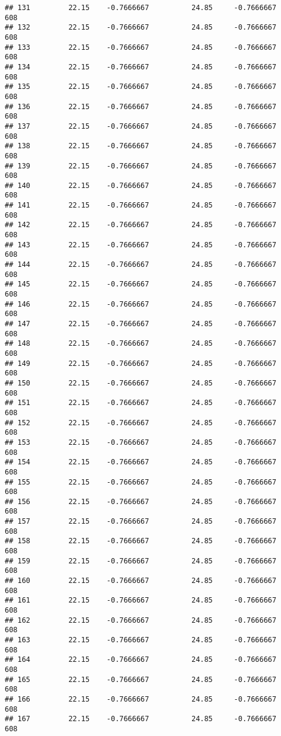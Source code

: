 \documentclass[]{article}
\begin{document}
\begin{verbatim}
## 131         22.15    -0.7666667          24.85     -0.7666667    608
## 132         22.15    -0.7666667          24.85     -0.7666667    608
## 133         22.15    -0.7666667          24.85     -0.7666667    608
## 134         22.15    -0.7666667          24.85     -0.7666667    608
## 135         22.15    -0.7666667          24.85     -0.7666667    608
## 136         22.15    -0.7666667          24.85     -0.7666667    608
## 137         22.15    -0.7666667          24.85     -0.7666667    608
## 138         22.15    -0.7666667          24.85     -0.7666667    608
## 139         22.15    -0.7666667          24.85     -0.7666667    608
## 140         22.15    -0.7666667          24.85     -0.7666667    608
## 141         22.15    -0.7666667          24.85     -0.7666667    608
## 142         22.15    -0.7666667          24.85     -0.7666667    608
## 143         22.15    -0.7666667          24.85     -0.7666667    608
## 144         22.15    -0.7666667          24.85     -0.7666667    608
## 145         22.15    -0.7666667          24.85     -0.7666667    608
## 146         22.15    -0.7666667          24.85     -0.7666667    608
## 147         22.15    -0.7666667          24.85     -0.7666667    608
## 148         22.15    -0.7666667          24.85     -0.7666667    608
## 149         22.15    -0.7666667          24.85     -0.7666667    608
## 150         22.15    -0.7666667          24.85     -0.7666667    608
## 151         22.15    -0.7666667          24.85     -0.7666667    608
## 152         22.15    -0.7666667          24.85     -0.7666667    608
## 153         22.15    -0.7666667          24.85     -0.7666667    608
## 154         22.15    -0.7666667          24.85     -0.7666667    608
## 155         22.15    -0.7666667          24.85     -0.7666667    608
## 156         22.15    -0.7666667          24.85     -0.7666667    608
## 157         22.15    -0.7666667          24.85     -0.7666667    608
## 158         22.15    -0.7666667          24.85     -0.7666667    608
## 159         22.15    -0.7666667          24.85     -0.7666667    608
## 160         22.15    -0.7666667          24.85     -0.7666667    608
## 161         22.15    -0.7666667          24.85     -0.7666667    608
## 162         22.15    -0.7666667          24.85     -0.7666667    608
## 163         22.15    -0.7666667          24.85     -0.7666667    608
## 164         22.15    -0.7666667          24.85     -0.7666667    608
## 165         22.15    -0.7666667          24.85     -0.7666667    608
## 166         22.15    -0.7666667          24.85     -0.7666667    608
## 167         22.15    -0.7666667          24.85     -0.7666667    608

\end{verbatim}
\end{document}
